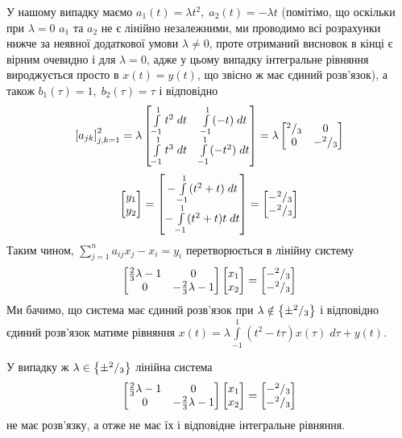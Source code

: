 \documentclass[10pt]{article}
\newcommand{\dt}{\;dt}
\let\oldint\int
\renewcommand{\int}{\oldint\limits}
\begin{document}
У нашому випадку маємо $a_1(t)=\lambda t^2,\;a_2(t)=-\lambda t$ (помітімо, що оскільки при $\lambda=0$
$a_1$ та $a_2$ не є лінійно незалежними, ми проводимо всі розрахунки нижче за неявної додаткової умови
$\lambda\neq0$, проте отриманий висновок в кінці є вірним очевидно і для $\lambda=0$, адже у цьому
випадку інтегральне рівняння вироджується просто в $x(t)=y(t)$, що звісно ж 
має єдиний розв’язок), а також $b_1(\tau)=1,\;b_2(\tau)=\tau$ і відповідно
\[\mysbra{a_{jk}}_{j,k=1}^2=\lambda\begin{bmatrix}
	\int_{-1}^1t^2\dt&\int_{-1}^1(-t)\dt\\
	\int_{-1}^1t^3\dt&\int_{-1}^1(-t^2)\dt
\end{bmatrix}=\lambda\begin{bmatrix}\myfrac{2}{3}&0\\0&-\myfrac{2}{3}\end{bmatrix}\]
	\[\begin{bmatrix}y_1\\y_2\end{bmatrix}=
		\begin{bmatrix}-\int_{-1}^1(t^2+t)\dt\\-\int_{-1}^1(t^2+t)t\dt\end{bmatrix}=
			\begin{bmatrix}-\myfrac{2}{3}\\-\myfrac{2}{3}
		\end{bmatrix}
		\]
Таким чином, $\sum_{j=1}^na_{ij}x_j-x_i=y_i$ перетворюється в лінійну систему
\[\begin{bmatrix}\frac{2}{3}\lambda-1&0\\0&-\frac{2}{3}\lambda-1\end{bmatrix}\begin{bmatrix}x_1\\x_2\end{bmatrix}=
	\begin{bmatrix}-{^{2}/_{3}}\\-{^{2}/_{3}}\end{bmatrix}\]
		Ми бачимо, що система має єдиний розв’язок при $\lambda\notin\left\{\pm{^{2}/_{3}}\right\}$ і відповідно єдиний розв’язок матиме
		рівняння  $x(t)=\lambda\int_{-1}^1(t^2-t\tau)x(\tau)\;d\tau+y(t)$.

		У випадку ж $\lambda\in\left\{\pm{^{2}/_{3}}\right\}$ лінійна система
		\[\begin{bmatrix}\frac{2}{3}\lambda-1&0\\0&-\frac{2}{3}\lambda-1\end{bmatrix}\begin{bmatrix}x_1\\x_2\end{bmatrix}=
	\begin{bmatrix}-{^{2}/_{3}}\\-{^{2}/_{3}}\end{bmatrix}\]
		не має розв’язку, а отже не має їх і відповідне інтегральне рівняння.
\end{document}
